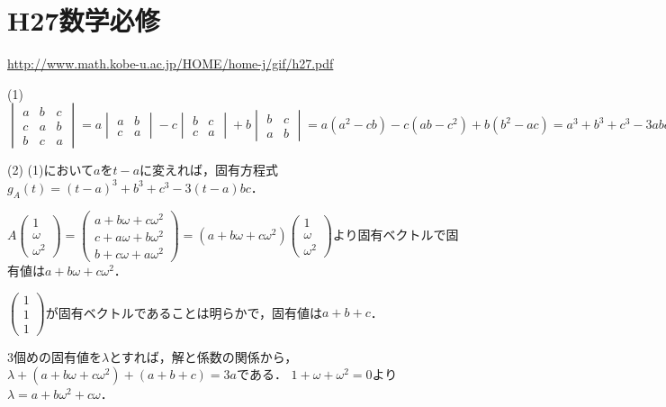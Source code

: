 \documentclass[
		book,
		head_space=20mm,
		foot_space=20mm,
		gutter=10mm,
		line_length=190mm
]{jlreq}
\begin{document}
\section{H27数学必修}
\url{http://www.math.kobe-u.ac.jp/HOME/home-j/gif/h27.pdf}

(1)
$\begin{vmatrix}
a & b & c \\
c & a & b \\
b & c & a
\end{vmatrix} = a\begin{vmatrix}
a & b \\
c & a
\end{vmatrix}
-c\begin{vmatrix}
    b & c \\
    c & a
\end{vmatrix}+b\begin{vmatrix}
    b & c \\
    a & b
\end{vmatrix} = a(a^2-cb)-c(ab-c^2)+b(b^2-ac) = a^3+b^3+c^3-3abc$

(2) (1)において$a$を$t-a$に変えれば，固有方程式$g_A(t)=(t-a)^3+b^3+c^3-3(t-a)bc$．

$A\begin{pmatrix}
    1 \\
    \omega \\
    \omega^2
\end{pmatrix} = \begin{pmatrix}
    a+b\omega+c\omega^2 \\
    c+a\omega+b\omega^2 \\
    b+c\omega+a\omega^2
\end{pmatrix} = (a+b\omega+c\omega^2)\begin{pmatrix}
    1 \\
    \omega \\
    \omega^2
\end{pmatrix}$より固有ベクトルで固有値は$a+b\omega+c\omega^2$．

$\begin{pmatrix}
    1 \\
    1 \\
    1
\end{pmatrix}$が固有ベクトルであることは明らかで，固有値は$a+b+c$．

3個めの固有値を$\lambda$とすれば，解と係数の関係から，$\lambda+(a+b\omega+c\omega^2)+(a+b+c)=3a$である．
$1+\omega+\omega^2=0$より$\lambda=a+b\omega^2+c\omega$．
\end{document}
